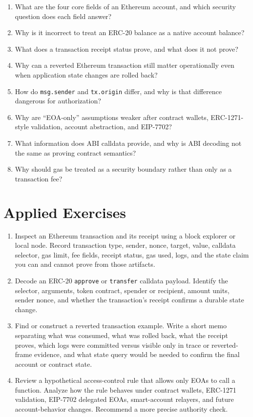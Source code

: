 \begin{enumerate}
\item What are the four core fields of an Ethereum account, and which security question does each field answer?
\item Why is it incorrect to treat an ERC-20 balance as a native account balance?
\item What does a transaction receipt status prove, and what does it not prove?
\item Why can a reverted Ethereum transaction still matter operationally even when application state changes are rolled back?
\item How do \texttt{msg.sender} and \texttt{tx.origin} differ, and why is that difference dangerous for authorization?
\item Why are ``EOA-only'' assumptions weaker after contract wallets, ERC-1271-style validation, account abstraction, and EIP-7702?
\item What information does ABI calldata provide, and why is ABI decoding not the same as proving contract semantics?
\item Why should gas be treated as a security boundary rather than only as a transaction fee?
\end{enumerate}

\section*{Applied Exercises}

\begin{enumerate}
\item Inspect an Ethereum transaction and its receipt using a block explorer or local node. Record transaction type, sender, nonce, target, value, calldata selector, gas limit, fee fields, receipt status, gas used, logs, and the state claim you can and cannot prove from those artifacts.

\item Decode an ERC-20 \texttt{approve} or \texttt{transfer} calldata payload. Identify the selector, arguments, token contract, spender or recipient, amount units, sender nonce, and whether the transaction's receipt confirms a durable state change.

\item Find or construct a reverted transaction example. Write a short memo separating what was consumed, what was rolled back, what the receipt proves, which logs were committed versus visible only in trace or reverted-frame evidence, and what state query would be needed to confirm the final account or contract state.

\item Review a hypothetical access-control rule that allows only EOAs to call a function. Analyze how the rule behaves under contract wallets, ERC-1271 validation, EIP-7702 delegated EOAs, smart-account relayers, and future account-behavior changes. Recommend a more precise authority check.
\end{enumerate}

